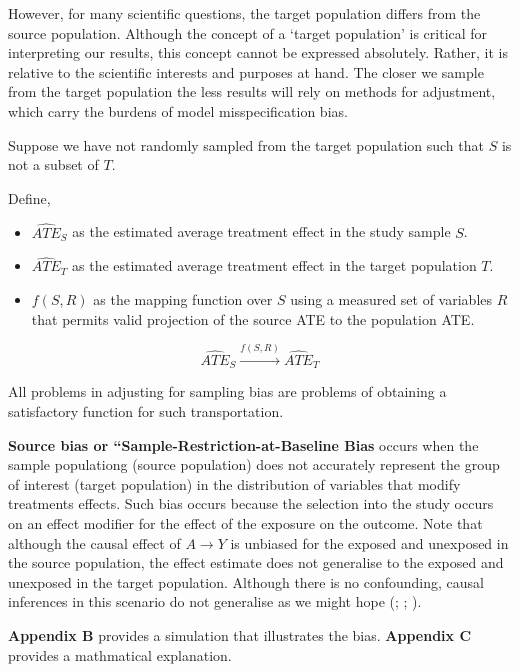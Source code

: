 \documentclass[
  single column]{article}
\providecommand{\tightlist}{%
  \setlength{\itemsep}{0pt}\setlength{\parskip}{0pt}}\usepackage{longtable,booktabs,array}
\begin{document}
However, for many scientific questions, the target population differs
from the source population. Although the concept of a `target
population' is critical for interpreting our results, this concept
cannot be expressed absolutely. Rather, it is relative to the scientific
interests and purposes at hand. The closer we sample from the target
population the less results will rely on methods for adjustment, which
carry the burdens of model misspecification bias.

Suppose we have not randomly sampled from the target population such
that \(S\) is not a subset of \(T\).

Define,

\begin{itemize}
\tightlist
\item
  \(\hat{ATE}_{S}\) as the estimated average treatment effect in the
  study sample \(S\).
\item
  \(\hat{ATE}_{T}\) as the estimated average treatment effect in the
  target population \(T\).
\item
  \(f(S, R)\) as the mapping function over \(S\) using a measured set of
  variables \(R\) that permits valid projection of the source ATE to the
  population ATE.
\end{itemize}

\[
\hat{ATE}_{S} \xrightarrow{f(S, R)} \hat{ATE}_{T}
\]

All problems in adjusting for sampling bias are problems of obtaining a
satisfactory function for such transportation.

\textbf{Source bias or ``Sample-Restriction-at-Baseline Bias} occurs
when the sample populationg (source population) does not accurately
represent the group of interest (target population) in the distribution
of variables that modify treatments effects. Such bias occurs because
the selection into the study occurs on an effect modifier for the effect
of the exposure on the outcome. Note that although the causal effect of
\(A\to Y\) is unbiased for the exposed and unexposed in the source
population, the effect estimate does not generalise to the exposed and
unexposed in the target population. Although there is no confounding,
causal inferences in this scenario do not generalise as we might hope
(;
;
).

\textbf{Appendix B} provides a simulation that illustrates the bias.
\textbf{Appendix C} provides a mathmatical explanation.
\end{document}
